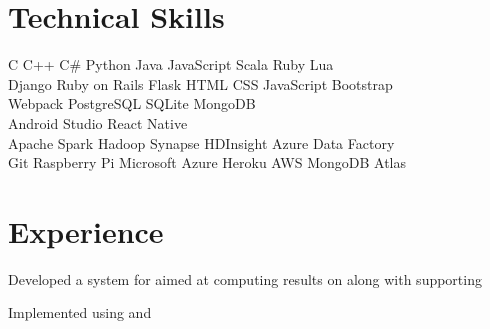 \documentclass[]{deedy-resume-openfont}
\begin{document}
\section{Technical Skills}
\begin{large}
 C \textbullet{}   C++ \textbullet{}  C\# \textbullet{} Python \textbullet{} Java \textbullet{}
JavaScript \textbullet{} Scala \textbullet{} Ruby \textbullet{} Lua \\

 Django \textbullet{} Ruby on Rails \textbullet{} Flask \textbullet{}
 HTML \textbullet{} CSS \textbullet{} JavaScript \textbullet{} Bootstrap \\ \hspace{36mm} \textbullet{} Webpack \textbullet{} PostgreSQL \textbullet{} SQLite \textbullet{} MongoDB \\

 Android Studio \textbullet{} React Native \\

 Apache Spark \textbullet{} Hadoop  \textbullet{} Synapse \textbullet{} HDInsight \textbullet{} Azure Data Factory \\

 Git \textbullet{} Raspberry Pi \textbullet{} Microsoft Azure \textbullet{} Heroku \textbullet{} AWS \textbullet{} MongoDB Atlas \\

\end{large}
\sectionsep

%
%

\section{Experience}
\begin{large}
\begin{tightemize}
    \item Developed a system for aimed at computing results on along with supporting 
    \item Implemented using and 
\end{tightemize}
\end{large}
\sectionsep
\end{document}
